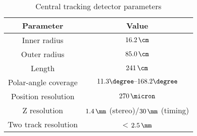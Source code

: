 \begin{table}[htbp]
	\centering
\begin{tabular}{ | c | c | }
     \hline
      Parameter & Value \\
			\hline
			\hline
			Inner radius & $16.2\,\cm$ \\ \hline
      Outer radius & $85.0\,\cm$  \\ \hline
			Length & $241\,\cm$ \\ \hline 
			Polar-angle coverage & $11.3\degree \mbox{--} 168.2\degree$ \\ \hline
			Position resolution & $270\,\micron$ \\ \hline
			Z resolution & $1.4\,\mm$ (stereo)/$30\,\mm$ (timing) \\ \hline
			Two track resolution & < $2.5\,\mm$ \\
      \hline
     \end{tabular}
	\caption{Central tracking detector parameters}
	\label{tab:ctdgeomparameters}
\end{table}
